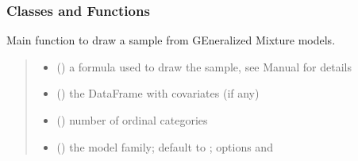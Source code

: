 \documentclass[letterpaper,10pt,english]{sphinxmanual}
\begin{document}
\subsubsection{Classes and Functions}
\label{\detokenize{cubmods:id72}}

\begin{fulllineitems}
\label{\detokenize{cubmods:cubmods.gem.draw}}
\pysigstartsignatures
{}
\pysigstopsignatures
\sphinxAtStartPar
Main function to draw a sample from GEneralized Mixture models.
\begin{quote}\begin{description}
\begin{itemize}
\item {} 
\sphinxAtStartPar
{} () \textendash{} a formula used to draw the sample, see
Manual for details

\item {} 
\sphinxAtStartPar
{} () \textendash{} the DataFrame with covariates (if any)

\item {} 
\sphinxAtStartPar
{} () \textendash{} number of ordinal categories

\item {} 
\sphinxAtStartPar
{} () \textendash{} the model family; default to ; options  and 


\end{itemize}
\end{description}
\end{quote}
\end{fulllineitems}
\end{document}
